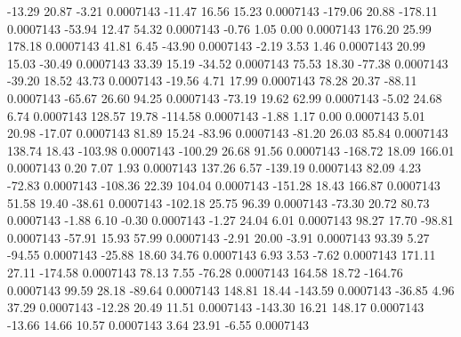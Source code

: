       -13.29       20.87       -3.21     0.0007143
      -11.47       16.56       15.23     0.0007143
     -179.06       20.88     -178.11     0.0007143
      -53.94       12.47       54.32     0.0007143
       -0.76        1.05        0.00     0.0007143
      176.20       25.99      178.18     0.0007143
       41.81        6.45      -43.90     0.0007143
       -2.19        3.53        1.46     0.0007143
       20.99       15.03      -30.49     0.0007143
       33.39       15.19      -34.52     0.0007143
       75.53       18.30      -77.38     0.0007143
      -39.20       18.52       43.73     0.0007143
      -19.56        4.71       17.99     0.0007143
       78.28       20.37      -88.11     0.0007143
      -65.67       26.60       94.25     0.0007143
      -73.19       19.62       62.99     0.0007143
       -5.02       24.68        6.74     0.0007143
      128.57       19.78     -114.58     0.0007143
       -1.88        1.17        0.00     0.0007143
        5.01       20.98      -17.07     0.0007143
       81.89       15.24      -83.96     0.0007143
      -81.20       26.03       85.84     0.0007143
      138.74       18.43     -103.98     0.0007143
     -100.29       26.68       91.56     0.0007143
     -168.72       18.09      166.01     0.0007143
        0.20        7.07        1.93     0.0007143
      137.26        6.57     -139.19     0.0007143
       82.09        4.23      -72.83     0.0007143
     -108.36       22.39      104.04     0.0007143
     -151.28       18.43      166.87     0.0007143
       51.58       19.40      -38.61     0.0007143
     -102.18       25.75       96.39     0.0007143
      -73.30       20.72       80.73     0.0007143
       -1.88        6.10       -0.30     0.0007143
       -1.27       24.04        6.01     0.0007143
       98.27       17.70      -98.81     0.0007143
      -57.91       15.93       57.99     0.0007143
       -2.91       20.00       -3.91     0.0007143
       93.39        5.27      -94.55     0.0007143
      -25.88       18.60       34.76     0.0007143
        6.93        3.53       -7.62     0.0007143
      171.11       27.11     -174.58     0.0007143
       78.13        7.55      -76.28     0.0007143
      164.58       18.72     -164.76     0.0007143
       99.59       28.18      -89.64     0.0007143
      148.81       18.44     -143.59     0.0007143
      -36.85        4.96       37.29     0.0007143
      -12.28       20.49       11.51     0.0007143
     -143.30       16.21      148.17     0.0007143
      -13.66       14.66       10.57     0.0007143
        3.64       23.91       -6.55     0.0007143
